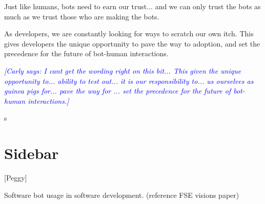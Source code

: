 \documentclass{sig-alternate}
\newcommand{\cl}[1]{\textcolor{blue}{{\it [Carly says: #1]}}}
\begin{document}
	Just like humans, bots need to earn our trust... and we can only trust the bots as much as we trust those who are making the bots. 

	As developers, we are constantly looking for ways to scratch our own itch.  This gives developers the unique opportunity to pave the way to adoption, and set the precedence for the future of bot-human interactions. 


	\cl{I cant get the wording right on this bit...  This given the unique opportunity to... ability to test out... it is our responsibility to... us ourselves as guinea pigs for... pave the way for ... set the precedence for the future of bot-human interactions.}


s
\section{Sidebar}

[Peggy]

Software bot usage in software development.
(reference FSE visions paper)




%



%


%

\listoftodos
%
%
\end{document}
